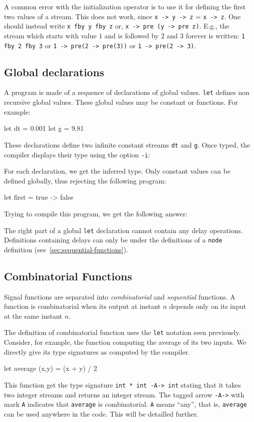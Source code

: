 \documentclass[11pt,titlepage,twoside]{report}
\newenvironment{sample}
  {\begin{flushright}\begin{minipage}[t]{15cm}\begin{alltt}}
  {\end{alltt}\end{minipage}\end{flushright}}
\begin{document}
\medskip{} A common error with the initialization
operator is to use it for defining the first two values of a
stream. This does not work, since \verb+x -> y -> z+ =
\verb+x -> z+. One should instead write \verb-x fby y fby z- or,
\verb+x -> pre (y -> pre z)+. E.g., the stream which starts with value
$1$ and is followed by $2$ and $3$ forever is written: \verb-1 fby 2 fby 3-
or \verb+1 -> pre(2 -> pre(3))+ or \verb+1 -> pre(2 -> 3)+.

\subsection{Global declarations}
A program is made of a sequence of declarations of global
values. \verb-let- defines non recursive global values. These global values may
be constant or functions. For example:
\begin{runverbatim}
let dt = 0.001
let g = 9.81
\end{runverbatim}
These declarations define two infinite constant streams \verb-dt- and
\verb-g-. Once typed, the compiler displays their type using the option {\tt -i}:
\begin{sample}\runverbatimcmd\end{sample}
\runverbatimmsg{}
For each declaration, we get the inferred type.
Only constant values can be defined globally, thus rejecting the
following program:
\begin{runverbatim}[fail]
let first = true -> false
\end{runverbatim}
Trying to compile this program, we get the following answer:
\begin{sample}\runverbatimcmd\end{sample}
\runverbatimerr{}
The right part of a global \verb-let- declaration cannot contain any
delay operations. Definitions containing delays can only be under the
definitions of a {\tt node} definition (see~\ref{sec:sequential-functions}).

\subsection{Combinatorial Functions}
Signal functions are separated into {\em combinatorial} and {\em
sequential} functions. A function is combinatorial when its output at
instant $n$ depends only on its input at the same instant $n$.

The definition of combinatorial function uses the {\tt let} notation
seen previously. Consider, for example, the function computing the
average of its two inputs. We directly give its type
signatures as computed by the compiler.
\begin{runverbatim}[withresult]
let average (x,y) = (x + y) / 2
\end{runverbatim}
This function get the type signature \verb+int * int -A-> int+ stating
that it takes two integer streams and returns an integer stream. The
tagged arrow \texttt{-A->} with mark \texttt{A} indicates that
\texttt{average} is combinatorial. \texttt{A} means ``any'', that is,
\texttt{average} can be used anywhere in the code. This will be
detailled further.
\end{document}
